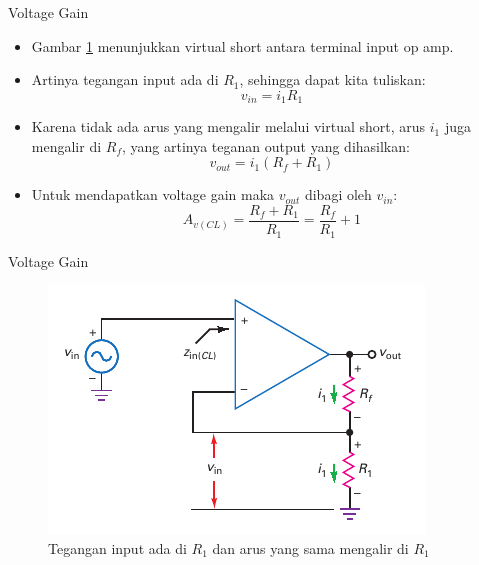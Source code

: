 \begin{frame}{Voltage Gain}
	\begin{itemize}
		\item Gambar \ref{fig-16.20} menunjukkan virtual short antara terminal input op amp.
		\item Artinya tegangan input ada di $ R_1 $, sehingga dapat kita tuliskan:\\
		
		\[ v_{in} = i_1 R_1 \]
		
		\item Karena tidak ada arus yang mengalir melalui virtual short, arus $ i_1 $ juga mengalir di $ R_f $, yang artinya teganan output yang dihasilkan:\\
		
		\[ v_{out} = i_1 (R_f + R_1) \]
		
		\item Untuk mendapatkan voltage gain maka $ v_{out} $ dibagi oleh $ v_{in} $:\\
		
		\begin{equation}\label{pers.16.12}
			A_{v(CL)} = \frac{R_f + R_1}{R_1} = \frac{R_f}{R_1} + 1
		\end{equation}
	
	\end{itemize}
\end{frame}

\begin{frame}{Voltage Gain}
	\begin{figure}
		\centering
		\includegraphics[width=\linewidth]{gambar/fig-16.20}
		\caption{Tegangan input ada di $ R_1 $ dan arus yang sama mengalir di $ R_1 $}
		\label{fig-16.20}
	\end{figure}
\end{frame}

